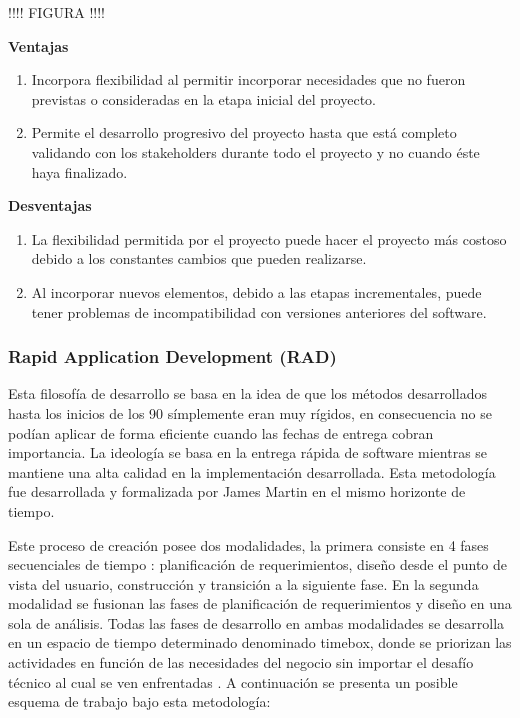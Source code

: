 !!!! FIGURA !!!!

\textbf{Ventajas}
\begin{enumerate}
  \item Incorpora flexibilidad al permitir incorporar necesidades que no fueron previstas o consideradas en la etapa inicial del proyecto.
  \item Permite el desarrollo progresivo del proyecto hasta que está completo validando con los stakeholders durante todo el proyecto y no cuando éste haya finalizado.
\end{enumerate}

\textbf{Desventajas}
\begin{enumerate}
  \item La flexibilidad permitida por el proyecto puede hacer el proyecto más costoso debido a los constantes cambios que pueden realizarse.
  \item Al  incorporar nuevos elementos, debido a las etapas incrementales, puede tener problemas de incompatibilidad con versiones anteriores del software.
\end{enumerate}

\subsubsection{Rapid Application Development (RAD) \label{sec:incremental_model}}
Esta filosofía de desarrollo se basa en la idea de que los métodos desarrollados hasta los inicios de los 90 símplemente eran muy rígidos, en consecuencia no se podían aplicar de forma eficiente cuando las fechas de entrega cobran importancia. La ideología se basa en la  entrega rápida de software mientras se mantiene una alta calidad en la implementación desarrollada. Esta metodología fue desarrollada y formalizada por James Martin en el mismo horizonte de tiempo.

Este proceso de creación posee dos modalidades, la primera consiste en 4 fases secuenciales de tiempo : planificación de requerimientos, diseño desde el punto de vista del usuario, construcción y transición a la siguiente fase. En la segunda modalidad se fusionan las fases de planificación de requerimientos y diseño en una sola de análisis. Todas las fases de desarrollo en ambas modalidades se desarrolla en un espacio de tiempo determinado denominado timebox, donde se priorizan las actividades en función de las necesidades del negocio sin importar el desafío técnico al cual se ven enfrentadas \cite{gottesdiener}. A continuación se presenta un posible esquema de trabajo bajo esta metodología:

